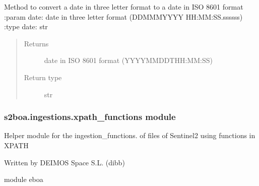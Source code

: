 \begin{fulllineitems}
\label{\detokenize{s2boa.ingestions:s2boa.ingestions.functions.three_letter_to_iso_8601}}
\sphinxAtStartPar
Method to convert a date in three letter format to a date in ISO 8601 format
:param date: date in three letter format (DD\sphinxhyphen{}MMM\sphinxhyphen{}YYYY HH:MM:SS.ssssss)
:type date: str
\begin{quote}\begin{description}
\item[{Returns}] \leavevmode
\sphinxAtStartPar
date in ISO 8601 format (YYYY\sphinxhyphen{}MM\sphinxhyphen{}DDTHH:MM:SS)

\item[{Return type}] \leavevmode
\sphinxAtStartPar
str

\end{description}\end{quote}

\end{fulllineitems}



\subsubsection{s2boa.ingestions.xpath\_functions module}
\label{\detokenize{s2boa.ingestions:module-s2boa.ingestions.xpath_functions}}\label{\detokenize{s2boa.ingestions:s2boa-ingestions-xpath-functions-module}}
\sphinxAtStartPar
Helper module for the ingestion\_functions. of files of Sentinel\sphinxhyphen{}2 using functions in XPATH

\sphinxAtStartPar
Written by DEIMOS Space S.L. (dibb)

\sphinxAtStartPar
module eboa

